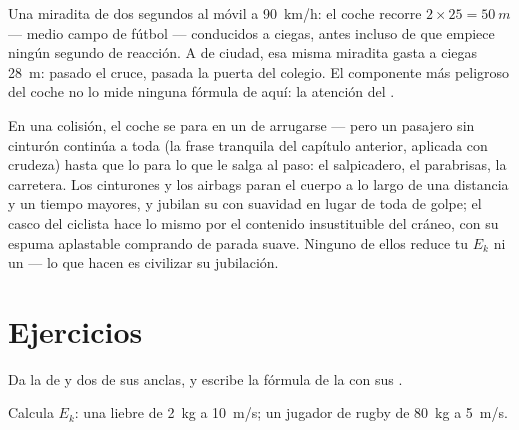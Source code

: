 \begin{example}\label{ex:g9:kinetic-energy-safety:glance}
Una miradita de dos segundos al móvil a \qty{90}{km/h}: el coche
recorre $2 \times 25 = \qty{50}{m}$ --- medio campo de fútbol ---
conducidos a ciegas, antes incluso de que empiece ningún segundo de
reacción. A  de ciudad, esa misma miradita gasta a ciegas
\qty{28}{m}: pasado el cruce, pasada la puerta del colegio. El
componente más peligroso del coche no lo mide ninguna fórmula de aquí:
la atención del .
\end{example}

\begin{remark}\label{rem:g9:kinetic-energy-safety:belts}
En una colisión, el coche se para en un  de arrugarse ---
pero un pasajero sin cinturón continúa a toda  (la frase
tranquila del capítulo anterior, aplicada con crudeza) hasta que lo
para lo que le salga al paso: el salpicadero, el parabrisas, la
carretera. Los cinturones y los airbags paran el cuerpo a lo largo de
una distancia y un tiempo mayores, y jubilan su 
con suavidad en lugar de toda de golpe; el casco del ciclista hace lo
mismo por el contenido insustituible del cráneo, con su espuma
aplastable comprando  de parada suave. Ninguno de ellos
reduce tu $E_k$ ni un  --- lo que hacen es civilizar su
jubilación.
\end{remark}

\section{Ejercicios}

\begin{exercise}[$\star$]\label{exo:g9:kinetic-energy-safety:1}
Da la  de  y dos de sus anclas, y escribe la
fórmula de la  con sus .
\end{exercise}

\begin{exercise}[$\star$]\label{exo:g9:kinetic-energy-safety:2}
Calcula $E_k$: una liebre de \qty{2}{kg} a \qty{10}{m/s}; un jugador de
rugby de \qty{80}{kg} a \qty{5}{m/s}.
\end{exercise}

